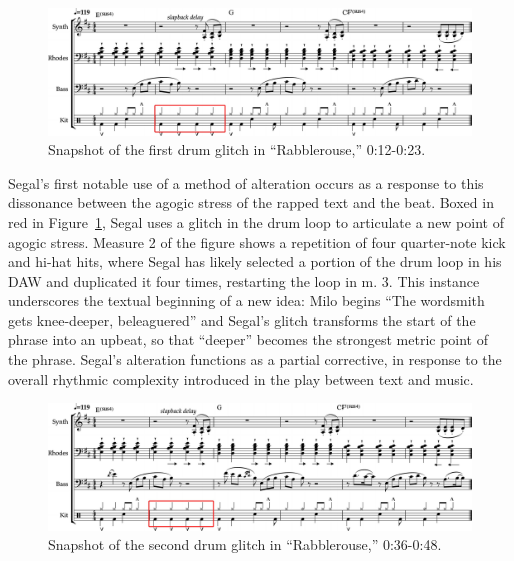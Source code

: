    \begin{figure}[ht]
        \centering
        \includegraphics[width=\textwidth]{images/figures/chp 02/012023rabblefirstglitch.pdf}
        \caption{Snapshot of the first drum glitch in ``Rabblerouse,'' 0:12-0:23.}
        \label{fig:rabblefirstglitch}
    \end{figure}

Segal's first notable use of a method of alteration occurs as a response to this dissonance between
the agogic stress of the rapped text and the beat. Boxed in red in Figure~\ref{fig:rabblefirstglitch}, 
Segal uses a glitch in the drum loop to articulate a new point of agogic stress. Measure 2 of the 
figure shows a repetition of four quarter-note kick and hi-hat hits, where Segal has likely selected 
a portion of the drum loop in his DAW and duplicated it four times, restarting the loop in m. 3. This
instance underscores the textual beginning of a new idea: Milo begins ``The wordsmith gets knee-deeper,
beleaguered'' and Segal's glitch transforms the start of the phrase into an upbeat, so that ``deeper''
becomes the strongest metric point of the phrase. Segal's alteration functions as a partial corrective, 
in response to the overall rhythmic complexity introduced in the play between text and music.

    \begin{figure}[ht]
        \centering
        \includegraphics[width=\textwidth]{images/figures/chp 02/036048rabblesecondglitch.pdf}
        \caption{Snapshot of the second drum glitch in ``Rabblerouse,'' 0:36-0:48.}
        \label{fig:rabblesecondglitch}
    \end{figure}

